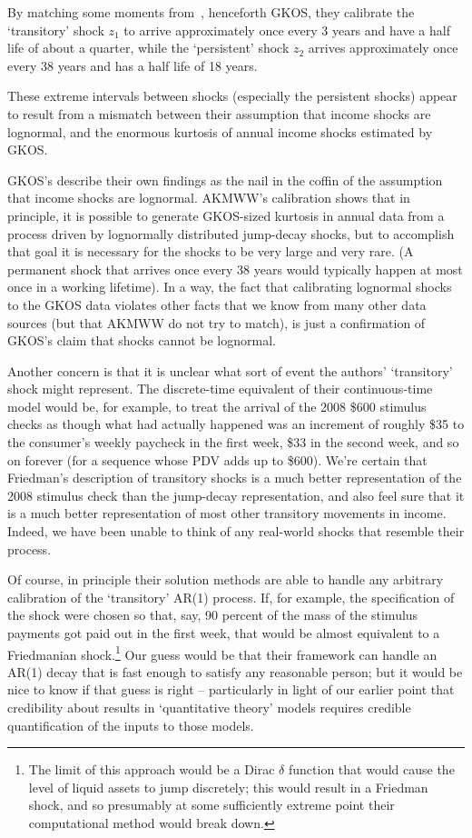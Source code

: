 \documentclass[titlepage]{econtex}
\begin{document}
By matching some moments from~\cite{gkosData}, henceforth GKOS, they calibrate the `transitory' shock $z_1$ to arrive approximately once every 3 years and have a half life of about a quarter, while the `persistent' shock $z_2$ arrives approximately once every 38 years and has a half life of 18 years.

These extreme intervals between shocks (especially the persistent shocks) appear to result from a mismatch between their assumption that income shocks are lognormal, and the enormous kurtosis of annual income shocks estimated by GKOS.

GKOS's describe their own findings as the nail in the coffin of the assumption that income shocks are lognormal.  AKMWW's calibration shows that in principle, it is possible to generate GKOS-sized kurtosis in annual data from a process driven by lognormally distributed jump-decay shocks, but to accomplish that goal it is necessary for the shocks to be very large and very rare.  (A permanent shock that arrives once every 38 years would typically happen at most once in a working lifetime).  In a way, the fact that calibrating lognormal shocks to the GKOS data violates other facts that we know from many other data sources (but that AKMWW do not try to match), is just a confirmation of GKOS's claim that shocks cannot be lognormal.

Another concern is that it is unclear what sort of event the authors' `transitory' shock might represent. The discrete-time equivalent of their continuous-time model would be, for example, to treat the arrival of the 2008 \$600 stimulus checks as though what had actually happened was an increment of roughly \$35 to the consumer's weekly paycheck in the first week, \$33 in the second week, and so on forever (for a sequence whose PDV adds up to \$600). We're certain that Friedman's description of transitory shocks is a much better representation of the 2008 stimulus check than the jump-decay representation, and also feel sure that it is a much better representation of most other transitory movements in income.  Indeed, we have been unable to think of any real-world shocks that resemble their process.

Of course, in principle their solution methods are able to handle any arbitrary calibration of the `transitory' AR(1) process.  If, for example, the specification of the shock were chosen so that, say, 90 percent of the mass of the stimulus payments got paid out in the first week, that would be almost equivalent to a Friedmanian shock.\footnote{The limit of this approach would be a Dirac $\delta$ function that would cause the level of liquid assets to jump discretely; this would result in a Friedman shock, and so presumably at some sufficiently extreme point their computational method would break down.}    Our guess would be that their framework can handle an AR(1) decay that is fast enough to satisfy any reasonable person; but it would be nice to know if that guess is right -- particularly in light of our earlier point that credibility about results in `quantitative theory' models requires credible quantification of the inputs to those models.
\end{document}
